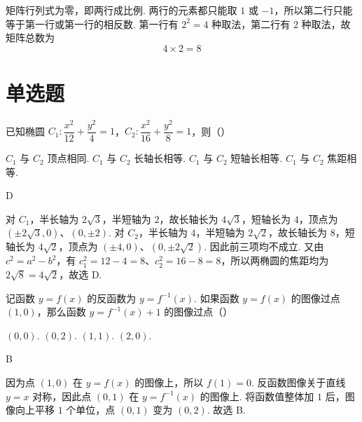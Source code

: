 \begin{solution}
矩阵行列式为零，即两行成比例. 两行的元素都只能取 \(1\) 或 \(-1\)，所以第二行只能等于第一行或第一行的相反数. 第一行有 \(2^2=4\) 种取法，第二行有 \(2\) 种取法，故矩阵总数为
\[
4\times2=8
\]
\end{solution}

\section{单选题}

\begin{problem}
已知椭圆 \(C_1:\dfrac{x^2}{12}+\dfrac{y^2}{4}=1\)，\(C_2:\dfrac{x^2}{16}+\dfrac{y^2}{8}=1\)，则（\quad）

\choices
    {\(C_1\) 与 \(C_2\) 顶点相同.}
    {\(C_1\) 与 \(C_2\) 长轴长相等.}
    {\(C_1\) 与 \(C_2\) 短轴长相等.}
    {\(C_1\) 与 \(C_2\) 焦距相等.}
\end{problem}

\begin{answer}
D
\end{answer}

\begin{solution}
对 \(C_1\)，半长轴为 \(2\sqrt3\)，半短轴为 \(2\)，故长轴长为 \(4\sqrt3\)，短轴长为 \(4\)，顶点为 \((\pm2\sqrt3,0)\)、\((0,\pm2)\). 对 \(C_2\)，半长轴为 \(4\)，半短轴为 \(2\sqrt2\)，故长轴长为 \(8\)，短轴长为 \(4\sqrt2\)，顶点为 \((\pm4,0)\)、\((0,\pm2\sqrt2)\). 因此前三项均不成立. 又由 \(c^2=a^2-b^2\)，有 \(c_1^2=12-4=8\)、\(c_2^2=16-8=8\)，所以两椭圆的焦距均为 \(2\sqrt8=4\sqrt2\)，故选 D.
\end{solution}

\begin{problem}
记函数 \(y=f(x)\) 的反函数为 \(y=f^{-1}(x)\). 如果函数 \(y=f(x)\) 的图像过点 \((1,0)\)，那么函数 \(y=f^{-1}(x)+1\) 的图像过点（\quad）

\choices
    {\((0,0)\).}
    {\((0,2)\).}
    {\((1,1)\).}
    {\((2,0)\).}
\end{problem}

\begin{answer}
B
\end{answer}

\begin{solution}
因为点 \((1,0)\) 在 \(y=f(x)\) 的图像上，所以 \(f(1)=0\). 反函数图像关于直线 \(y=x\) 对称，因此点 \((0,1)\) 在 \(y=f^{-1}(x)\) 的图像上. 将函数值整体加 \(1\) 后，图像向上平移 \(1\) 个单位，点 \((0,1)\) 变为 \((0,2)\). 故选 B.
\end{solution}

